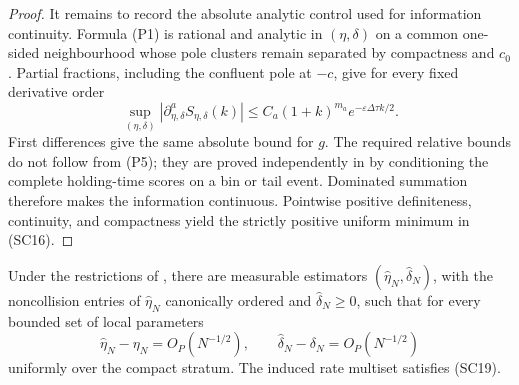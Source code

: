 \begin{proof}
It remains to record the absolute analytic control used for information
continuity.  Formula \textup{(P1)} is rational and analytic in
\((\eta,\delta)\) on a common one-sided neighbourhood whose pole clusters
remain separated by compactness and \(c_0\).  Partial fractions, including
the confluent pole at \(-c\), give for every fixed derivative order
\[
 \sup_{(\eta,\delta)}
 |\partial_{\eta,\delta}^a S_{\eta,\delta}(k)|
 \le C_a(1+k)^{m_a}e^{-\varepsilon\Delta\tau k/2}.
\tag{P5}
\]
First differences give the same absolute bound for \(g\).  The required
relative bounds do not follow from \textup{(P5)}; they are proved independently
in  by conditioning the complete
holding-time scores on a bin or tail event.  Dominated summation therefore
makes the information continuous.  Pointwise positive definiteness,
continuity, and compactness yield the strictly positive uniform minimum in
\textup{(SC16)}.
\end{proof}

\begin{lemma}
\label{lem:serial-collision-recurrence-estimator-main}
Under the restrictions of , there
are measurable estimators \((\widehat\eta_N,\widehat\delta_N)\), with the
noncollision entries of \(\widehat\eta_N\) canonically ordered and
\(\widehat\delta_N\ge0\), such that for every bounded set of local parameters
\[
 \widehat\eta_N-\eta_N=O_P(N^{-1/2}),
 \qquad
 \widehat\delta_N-\delta_N=O_P(N^{-1/2})
\tag{P6}
\]
uniformly over the compact stratum.  The induced rate multiset satisfies
\textup{(SC19)}.
\end{lemma}

